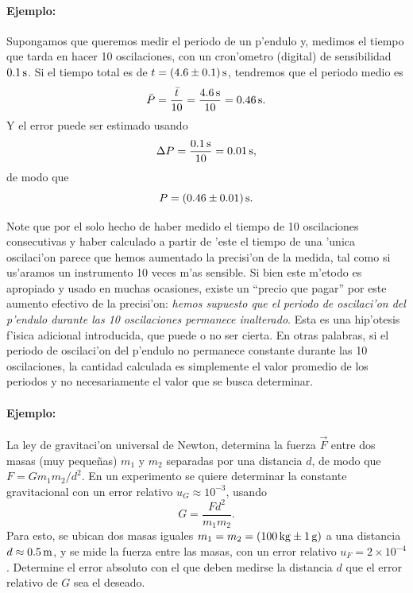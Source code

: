 \paragraph{Ejemplo:}
Supongamos que queremos medir el periodo de un p'endulo y, medimos el tiempo que tarda en hacer 10 oscilaciones, con un cron'ometro (digital) de sensibilidad $0.1\,\rm s$. Si el tiempo total es de $t=(4.6\pm 0.1)\,\rm s$, tendremos que el periodo medio es 
\begin{equation}
\bar{P} = \frac{\bar{t}}{10}=\frac{4.6\,\rm s}{10}=0.46{\,\rm s}.
\end{equation}
Y el error puede ser estimado usando
\begin{equation}
\Delta P = \frac{0.1\,\rm s}{10}=0.01{\,\rm s},
\end{equation}
de modo que
\begin{equation}
P=(0.46\pm 0.01){\,\rm s}.
\end{equation}

Note que por el solo hecho de haber medido el tiempo de 10 oscilaciones consecutivas y haber calculado a partir de 'este el tiempo de una 'unica oscilaci'on parece que hemos aumentado la precisi'on de la medida, tal como si us'aramos un instrumento 10 veces m'as sensible. Si bien este m'etodo es apropiado y usado en muchas ocasiones, existe un ``precio que pagar'' por este aumento efectivo de la precisi'on: \textit{hemos supuesto que el periodo de oscilaci'on del p'endulo durante las 10 oscilaciones permanece inalterado}. Esta es una hip'otesis f'isica adicional introducida, que puede o no ser cierta. En otras palabras, si el periodo de oscilaci'on del p'endulo no permanece constante durante las 10 oscilaciones, la cantidad calculada es simplemente el valor promedio de los periodos y no necesariamente el valor que se busca determinar.

\paragraph{Ejemplo:}
La ley de gravitaci'on universal de Newton, determina la fuerza $\vec{F}$ entre dos masas (muy peque\~nas) $m_1$ y $m_2$ separadas por una distancia $d$, de modo que $
F=G{m_1m_2}/{d^2}$. En un experimento se quiere determinar la constante gravitacional con un error relativo $u_G\approx 10^{-3}$, usando 
\begin{equation}
G=\frac{Fd^2}{m_1m_2}.
\end{equation}
Para esto, se ubican dos masas iguales $m_1=m_2=(100{\,\rm kg}\pm 1{\,\rm g})$ a una distancia $d\approx 0.5{\, \rm m}$, y se mide la fuerza entre las masas, con un error relativo $u_F=2\times 10^{-4}$. Determine el error absoluto con el que deben medirse la distancia $d$ que el error relativo de $G$ sea el deseado.


